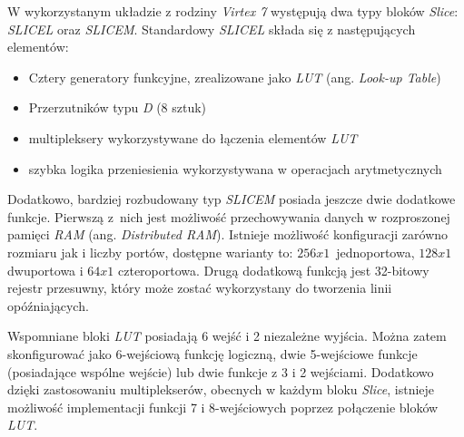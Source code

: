 W wykorzystanym układzie z rodziny \textit{Virtex 7} występują dwa typy bloków \textit{Slice}: \textit{SLICEL} oraz \textit{SLICEM}. Standardowy \textit{SLICEL} składa się z następujących elementów:
    \begin{itemize}[itemsep=-1ex]
    \item Cztery generatory funkcyjne, zrealizowane jako \textit{LUT} (ang. \textit{Look-up Table})
    \item Przerzutników typu \textit{D} (8 sztuk)
    \item multipleksery wykorzystywane do łączenia elementów \textit{LUT}
    \item szybka logika przeniesienia wykorzystywana w operacjach arytmetycznych
    \end{itemize}   

Dodatkowo, bardziej rozbudowany typ \textit{SLICEM} posiada jeszcze dwie dodatkowe funkcje. Pierwszą z~nich jest możliwość przechowywania danych w rozproszonej pamięci \textit{RAM} (ang. \textit{Distributed RAM}). Istnieje możliwość konfiguracji zarówno rozmiaru jak i liczby portów, dostępne warianty to: $256x1$~jednoportowa, $128x1$ dwuportowa i $64x1$ czteroportowa. Drugą dodatkową funkcją jest 32-bitowy rejestr przesuwny, który może zostać wykorzystany do tworzenia linii opóźniających.

Wspomniane bloki \textit{LUT} posiadają 6 wejść i 2 niezależne wyjścia. Można zatem skonfigurować jako 6-wejściową funkcję logiczną, dwie 5-wejściowe funkcje (posiadające wspólne wejście) lub dwie funkcje z 3 i 2 wejściami. Dodatkowo dzięki zastosowaniu multiplekserów, obecnych w każdym bloku \textit{Slice}, istnieje możliwość implementacji funkcji 7 i 8-wejściowych poprzez połączenie bloków \textit{LUT}.

